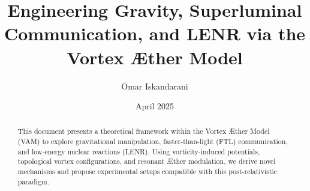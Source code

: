 \documentclass[11pt]{article}
\title{Engineering Gravity, Superluminal Communication, and LENR via the Vortex Æther Model}
\author{Omar Iskandarani}
\date{April 2025}
\begin{document}
    \maketitle

    \begin{abstract}
        This document presents a theoretical framework within the Vortex Æther Model (VAM) to explore gravitational manipulation, faster-than-light (FTL) communication, and low-energy nuclear reactions (LENR). Using vorticity-induced potentials, topological vortex configurations, and resonant Æther modulation, we derive novel mechanisms and propose experimental setups compatible with this post-relativistic paradigm.
    \end{abstract}

    \tableofcontents
    \newpage


    

    

    

    

    

    

    
    
\end{document}
